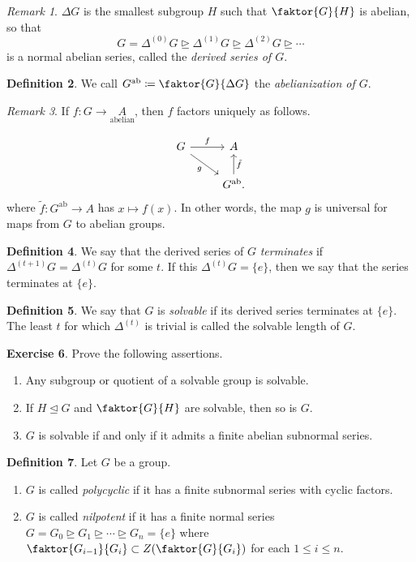 \documentclass[10pt,letterpaper,cm]{nupset}
\theoremstyle{definition}
\newtheorem{definition}{Definition}[subsection]
\theoremstyle{theorem}
\newtheorem{exercise}[definition]{Exercise}
\theoremstyle{remark}
\newtheorem{remark}[definition]{Remark}
\newcommand{\1}{\mathbf{1}}
\newcommand{\0}{\vec 0}
\DeclareMathOperator{\ab}{ab}
\begin{document}
\begin{remark}
$\Delta G$ is the smallest subgroup $H$ such that $\faktor{G}{H}$ is abelian, so that $$G = \Delta^{(0)}G \unrhd \Delta^{(1)}G \unrhd \Delta^{(2)}G \unrhd \cdots $$ is a normal abelian series, called the \textit{derived series of $G$}.
\end{remark}

\begin{definition}
We call $G^{\ab}\coloneqq  \faktor{G}{\Delta G}$ the \textit{abelianization of $G$}.
\end{definition}

\begin{remark}
If $f: G \to \underset{\text{abelian}} A$, then $f$ factors uniquely as follows.

\[ \begin{tikzcd}
G \arrow[r, "f"] \arrow[dr, "g", swap] & A \\%
 & G^{\ab}\arrow[u, "\tilde{f}", swap].
\end{tikzcd}
\]
where $\tilde{f}: G^{\ab} \to A$ has $x\mapsto f(x)$.
In other words, the map $g$ is universal for maps from $G$ to abelian groups. 
\end{remark}

\begin{definition}
We say that the derived series of $G$ \textit{terminates} if $\Delta^{(t+1)}G = \Delta^{(t)}G$ for some $t$. If this $\Delta^{(t)}G=\{e\}$, then we say that the series terminates at $\{e\}$.
\end{definition}

\begin{definition}
We say that $G$ is \textit{solvable} if its derived series terminates at $\{e\}$. The least $t$ for which $\Delta^{(t)}$ is trivial is called the solvable length of $G$.
\end{definition}

\begin{exercise}\label{ex7} Prove the following assertions.
\begin{enumerate}
\item Any subgroup or quotient of a solvable group is solvable.
\item If $H\unlhd G$ and $\faktor{G}{H}$ are solvable, then so is $G$.
\item $G$ is solvable  if and only if it admits a finite abelian subnormal series. 
\end{enumerate}
\end{exercise}

\begin{definition}{Let $G$ be a group.}
\begin{enumerate}
\item $G$ is called \textit{polycyclic} if it has a finite subnormal series with cyclic factors.
\item $G$ is called \textit{nilpotent} if it has a finite normal series  $G =G_0 \unrhd G_1 \unrhd \cdots \unrhd G_n = \{e\}$ where $\faktor{G_{i-1}}{G_i}\subset Z(\faktor{G}{G_i})$ for each $1\leq i\leq n$.
\end{enumerate}
\end{definition}
\end{document}
